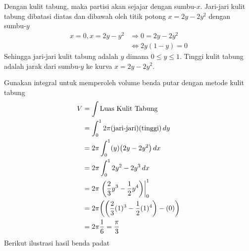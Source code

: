 \begin{enumerate}[leftmargin=*, label={\arabic*}.]
\begin{enumerate}[label={\alph*}.]
    Dengan kulit tabung, maka partisi akan sejajar dengan sumbu-$x$. Jari-jari 
    kulit tabung dibatasi diatas dan dibawah oleh titik potong $x=2y-2y^{2}$ dengan 
    sumbu-$y$
    \begin{align*}
        x=0, x=2y-y^{2} &\Longrightarrow 0 = 2y-2y^{2}\\
        &\iff 2y(1-y)=0
    \end{align*}
    Sehingga jari-jari kulit tabung adalah $y$ dimana $0 \leq y \leq 1$. Tinggi 
    kulit tabung adalah jarak dari sumbu-$y$ ke kurva $x=2y-2y^{2}$.

    Gunakan integral untuk memperoleh volume benda putar dengan metode kulit tabung
    \begin{align*}
        V &= \int \text{Luas Kulit Tabung}\\
        &=\int_{0}^{1} 2\pi(\text{jari-jari})(\text{tinggi})\,dy\\
        &=2\pi\int_{0}^{1} (y)\brk*{2y-2y^{2}}\,dx\\
        &=2\pi\int_{0}^{1} 2y^{2}-2y^{3}\,dx\\
        &=2\pi \eval{\frac{2}{3}y^{3}-\frac{1}{2}y^{4}}{0}{1}\\
        &=2\pi \brk*{\brk*{\frac{2}{3}(1)^{3}-\frac{1}{2}(1)^{4}}-(0)}\\
        &=2\pi\frac{1}{6} = \frac{\pi}{3}
    \end{align*}
    Berikut ilustrasi hasil benda padat
\begin{center}
\end{center}
\end{enumerate}
\end{enumerate}

